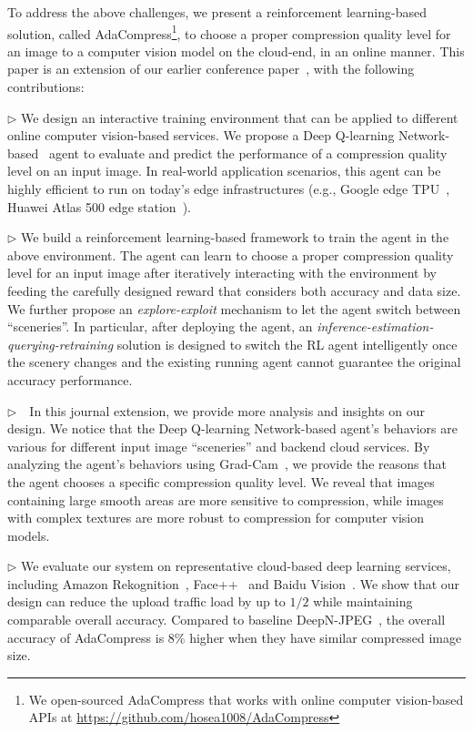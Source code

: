 To address the above challenges, we present a reinforcement learning-based solution, called AdaCompress\footnote{We open-sourced AdaCompress that works with online computer vision-based APIs at \url{https://github.com/hosea1008/AdaCompress}}, to choose a proper compression quality level for an image to a computer vision model on the cloud-end, in an online manner. This paper is an extension of our earlier conference paper~\cite{2019adacompress}, with the following contributions:

$\rhd$ We design an interactive training environment that can be applied to different online computer vision-based services. We propose a Deep Q-learning Network-based~\cite{DQN} agent to evaluate and predict the performance of a compression quality level on an input image. In real-world application scenarios, this agent can be highly efficient to run on today's edge infrastructures (e.g., Google edge TPU~\cite{google-tpu}, Huawei Atlas 500 edge station~\cite{huawei-atlas500}).
	
$\rhd$ We build a reinforcement learning-based framework to train the agent in the above environment. The agent can learn to choose a proper compression quality level for an input image after iteratively interacting with the environment by feeding the carefully designed reward that considers both accuracy and data size. We further propose an \emph{explore-exploit} mechanism to let the agent switch between ``sceneries''. In particular, after deploying the agent, an \emph{inference-estimation-querying-retraining} solution is designed to switch the RL agent intelligently once the scenery changes and the existing running agent cannot guarantee the original accuracy performance.
	
$\rhd$~~In this journal extension, we provide more analysis and insights on our design. We notice that the Deep Q-learning Network-based agent's behaviors are various for different input image “sceneries” and backend cloud services. By analyzing the agent's behaviors using Grad-Cam~\cite{grad-cam}, we provide the reasons that the agent chooses a specific compression quality level. We reveal that images containing large smooth areas are more sensitive to compression, while images with complex textures are more robust to compression for computer vision models.
	
$\rhd$ We evaluate our system on representative cloud-based deep learning services, including Amazon Rekognition~\cite{amazon_rekognition}, Face++~\cite{face++_service} and Baidu Vision~\cite{baidu_vision}. We show that our design can reduce the upload traffic load by up to $1/2$ while maintaining comparable overall accuracy. Compared to baseline DeepN-JPEG~\cite{DeepN-JPEG}, the overall accuracy of AdaCompress is $8\%$ higher when they have similar compressed image size.


